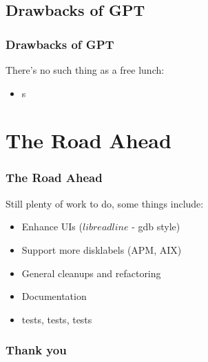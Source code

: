 \documentclass{beamer}
\begin{document}
\subsection{Drawbacks of GPT}
\begin{frame}\frametitle{Drawbacks of GPT}
  There's no such thing as a free lunch:
  \begin{itemize}
    \item s
  \end{itemize}
\end{frame}


\section{The Road Ahead}
\begin{frame}\frametitle{The Road Ahead}
  Still plenty of work to do, some things include:
 \begin{itemize}
  \item Enhance UIs ($libreadline$ - gdb style)
  \item Support more disklabels (APM, AIX)
  \item General cleanups and refactoring
  \item Documentation
  \item tests, tests, tests
  \end{itemize}
\end{frame}

\begin{frame}\frametitle{Thank you}
\end{frame}
\end{document}
